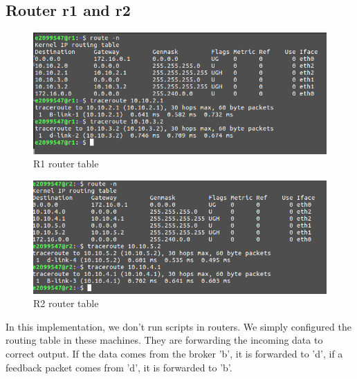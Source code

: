 \documentclass[12pt,journal,compsoc]{IEEEtran}
\begin{document}
\subsection{Router r1 and r2}
\begin{figure}[h!]
\centering
\captionsetup{justification=centering}
\includegraphics[width = \linewidth]{router1.png}
\caption{R1 router table}
\label{fig:router1}
\end{figure}
\begin{figure}[h!]
\centering
\captionsetup{justification=centering}
\includegraphics[width = \linewidth]{router2.png}
\caption{R2 router table}
\label{fig:router2}
\end{figure}
In this implementation, we don't run scripts in routers. We simply configured the routing table in these machines. They are forwarding the incoming data to correct output. If the data comes from the broker 'b', it is forwarded to 'd', if a feedback packet comes from 'd', it is forwarded to 'b'.
\end{document}
